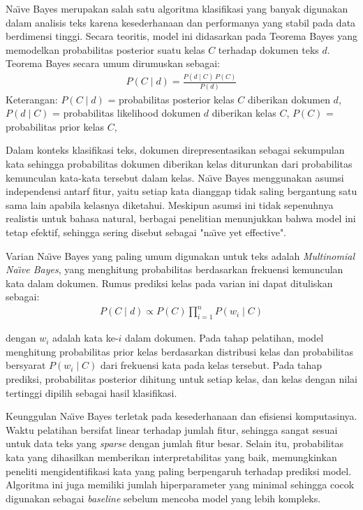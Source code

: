 Na\"{\i}ve Bayes merupakan salah satu algoritma klasifikasi yang banyak digunakan dalam analisis teks karena kesederhanaan dan performanya yang stabil pada data berdimensi tinggi. Secara teoritis, model ini didasarkan pada Teorema Bayes yang memodelkan probabilitas posterior suatu kelas $C$ terhadap dokumen teks $d$. Teorema Bayes secara umum dirumuskan sebagai:
\begin{align}
P(C \mid d) = \frac{P(d \mid C)\, P(C)}{P(d)} \label{eq=teorema-bayes}
\end{align}
Keterangan:
$P(C \mid d)$ = probabilitas posterior kelas $C$ diberikan dokumen $d$,  
$P(d \mid C)$ = probabilitas likelihood dokumen $d$ diberikan kelas $C$,  
$P(C)$ = probabilitas prior kelas $C$,

Dalam konteks klasifikasi teks, dokumen direpresentasikan sebagai sekumpulan kata sehingga probabilitas dokumen diberikan kelas diturunkan dari probabilitas kemunculan kata-kata tersebut dalam kelas. Na\"{\i}ve Bayes menggunakan asumsi independensi antarf fitur, yaitu setiap kata dianggap tidak saling bergantung satu sama lain apabila kelasnya diketahui. Meskipun asumsi ini tidak sepenuhnya realistis untuk bahasa natural, berbagai penelitian menunjukkan bahwa model ini tetap efektif, sehingga sering disebut sebagai "na\"{\i}ve yet effective".

Varian Na\"{\i}ve Bayes yang paling umum digunakan untuk teks adalah \textit{Multinomial Na\"{\i}ve Bayes}, yang menghitung probabilitas berdasarkan frekuensi kemunculan kata dalam dokumen. Rumus prediksi kelas pada varian ini dapat dituliskan sebagai:
\begin{align}
P(C \mid d) \propto P(C) \prod_{i=1}^{n} P(w_i \mid C) \label{eq=rumus-Multinomial-NB}
\end{align}

dengan $w_i$ adalah kata ke-$i$ dalam dokumen. Pada tahap pelatihan, model menghitung probabilitas prior kelas berdasarkan distribusi kelas dan probabilitas bersyarat $P(w_i \mid C)$ dari frekuensi kata pada kelas tersebut. Pada tahap prediksi, probabilitas posterior dihitung untuk setiap kelas, dan kelas dengan nilai tertinggi dipilih sebagai hasil klasifikasi.

Keunggulan Na\"{\i}ve Bayes terletak pada kesederhanaan dan efisiensi komputasinya. Waktu pelatihan bersifat linear terhadap jumlah fitur, sehingga sangat sesuai untuk data teks yang \textit{sparse} dengan jumlah fitur besar. Selain itu, probabilitas kata yang dihasilkan memberikan interpretabilitas yang baik, memungkinkan peneliti mengidentifikasi kata yang paling berpengaruh terhadap prediksi model. Algoritma ini juga memiliki jumlah hiperparameter yang minimal sehingga cocok digunakan sebagai \textit{baseline} sebelum mencoba model yang lebih kompleks. 

